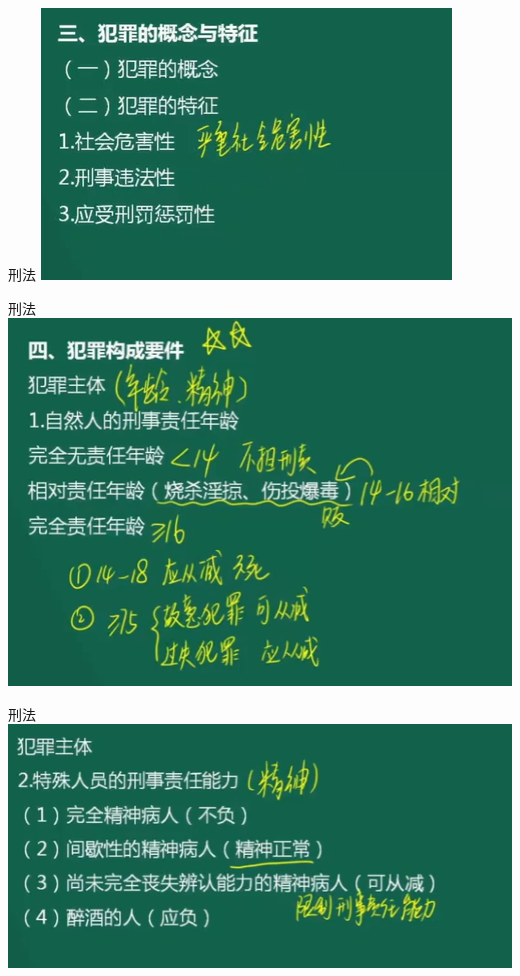 \documentclass[aspectratio=169]{beamer}
\begin{document}
\begin{frame}[t]{刑法}
    \includegraphics[scale=0.4]{criminal_concecpt}\\ 
\end{frame}


\begin{frame}[t]{刑法}
    \includegraphics[scale=0.4]{criminal_element}\\ 
\end{frame}



\begin{frame}[t]{刑法}
    \includegraphics[scale=0.4]{criminal_entity}\\ 
\end{frame}
\end{document}

